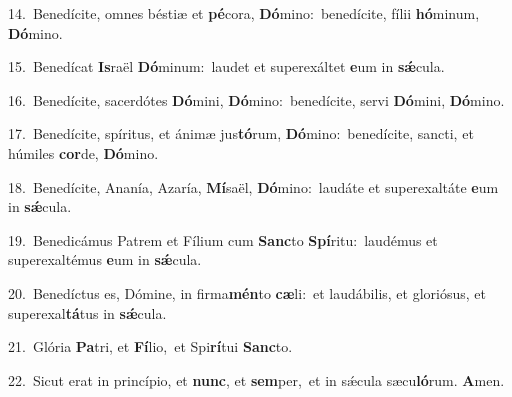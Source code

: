 {\numbfont\textcolor{\numbcolor}{14.}}~Benedícite, omnes béstiæ et \textbf{pé}\-cora, \textbf{Dó}\-mino:~\star benedícite, fílii \textbf{hó}\-minum, \textbf{Dó}\-mino.\par
{\numbfont\textcolor{\numbcolor}{15.}}~Benedícat \textbf{Is}\-raël \textbf{Dó}\-minum:~\star laudet et superexáltet \textbf{e}\-um in \textbf{sǽ}\-cula.\par
{\numbfont\textcolor{\numbcolor}{16.}}~Benedícite, sacerdótes \textbf{Dó}\-mini, \textbf{Dó}\-mino:~\star benedícite, servi \textbf{Dó}\-mini, \textbf{Dó}\-mino.\par
{\numbfont\textcolor{\numbcolor}{17.}}~Benedícite, spíritus, et ánimæ jus\-\textbf{tó}\-rum, \textbf{Dó}\-mino:~\star benedícite, sancti, et húmiles \textbf{cor}\-de, \textbf{Dó}\-mino.\par
{\numbfont\textcolor{\numbcolor}{18.}}~Benedícite, Ananía, Azaría, \textbf{Mí}\-saël, \textbf{Dó}\-mino:~\star laudáte et superexaltáte \textbf{e}\-um in \textbf{sǽ}\-cula.\par
{\numbfont\textcolor{\numbcolor}{19.}}~Benedicámus Patrem et Fílium cum \textbf{Sanc}\-to \textbf{Spí}\-ritu:~\star laudémus et superexaltémus \textbf{e}\-um in \textbf{sǽ}\-cula.\par
{\numbfont\textcolor{\numbcolor}{20.}}~Benedíctus es, Dómine, in firma\-\textbf{mén}\-to \textbf{cæ}\-li:~\star et laudábilis, et gloriósus, et superexal\-\textbf{tá}\-tus in \textbf{sǽ}\-cula.\par
{\numbfont\textcolor{\numbcolor}{21.}}~Glória \textbf{Pa}\-tri, et \textbf{Fí}\-lio,~\star et Spi\-\textbf{rí}\-tui \textbf{Sanc}\-to.\par
{\numbfont\textcolor{\numbcolor}{22.}}~Sicut erat in princípio, et \textbf{nunc}\-, et \textbf{sem}\-per,~\star et in sǽcula sæcu\-\textbf{ló}\-rum. \textbf{A}\-men.\par
